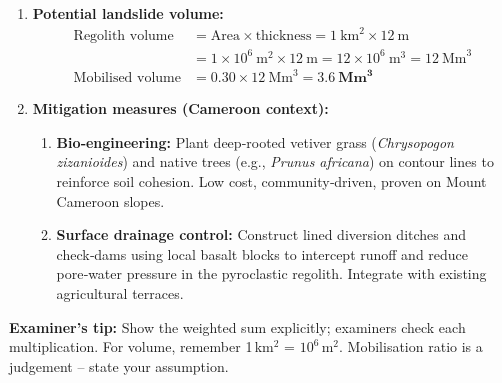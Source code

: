 \documentclass[11pt]{article}
\begin{document}
\begin{exoresolu}
\begin{enumerate}
\item \textbf{Potential landslide volume:}
\begin{align*}
\text{Regolith volume} &= \text{Area} \times \text{thickness} = 1\ \text{km}^2 \times 12\ \text{m}\\
&= 1 \times 10^6\ \text{m}^2 \times 12\ \text{m} = 12 \times 10^6\ \text{m}^3 = 12\ \text{Mm}^3\\
\text{Mobilised volume} &= 0.30 \times 12\ \text{Mm}^3 = \mathbf{3.6\ \text{Mm}^3}
\end{align*}
\item \textbf{Mitigation measures (Cameroon context):}
\begin{enumerate}
\item \textbf{Bio‑engineering:} Plant deep‑rooted vetiver grass (\emph{Chrysopogon zizanioides}) and native trees (e.g., \emph{Prunus africana}) on contour lines to reinforce soil cohesion. Low cost, community‑driven, proven on Mount Cameroon slopes.
\item \textbf{Surface drainage control:} Construct lined diversion ditches and check‑dams using local basalt blocks to intercept runoff and reduce pore‑water pressure in the pyroclastic regolith. Integrate with existing agricultural terraces.
\end{enumerate}
\end{enumerate}
\textbf{Examiner's tip:} Show the weighted sum explicitly; examiners check each multiplication. For volume, remember 1\,km$^2$ = $10^6$\,m$^2$. Mobilisation ratio is a judgement – state your assumption.
\end{exoresolu}
\end{document}
